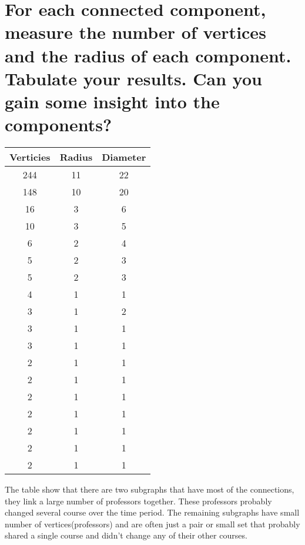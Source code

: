 \documentclass[]{article}
\begin{document}
  \section{For each connected component, measure the number of vertices and the radius of each component. Tabulate your results. Can you gain some insight into the components?}
  \begin{center}
    \begin{tabular}{| c | c | c |}
      \hline
      Verticies & Radius & Diameter \\
      \hline
      244 & 11 & 22 \\
      \hline
      148 & 10 & 20 \\
      \hline
      16 & 3 & 6 \\
      \hline
      10 & 3 & 5 \\
      \hline
      6 & 2 & 4 \\
      \hline
      5 & 2 & 3 \\
      \hline
      5 & 2 & 3 \\
      \hline
      4 & 1 & 1 \\
      \hline
      3 & 1 & 2 \\
      \hline
      3 & 1 & 1 \\
      \hline
      3 & 1 & 1 \\
      \hline
      2 & 1 & 1 \\
      \hline
      2 & 1 & 1 \\
      \hline
      2 & 1 & 1 \\
      \hline
      2 & 1 & 1 \\
      \hline
      2 & 1 & 1 \\
      \hline
      2 & 1 & 1 \\
      \hline
      2 & 1 & 1 \\
      \hline
    \end{tabular}
  \end{center}

The table show that there are two subgraphs that have most of the connections, they link a large number of professors together. These professors probably changed several course over the time period. The remaining subgraphs have small number of vertices(professors) and are often just a pair or small set that probably shared a single course and didn't change any of their other courses.
\end{document}
